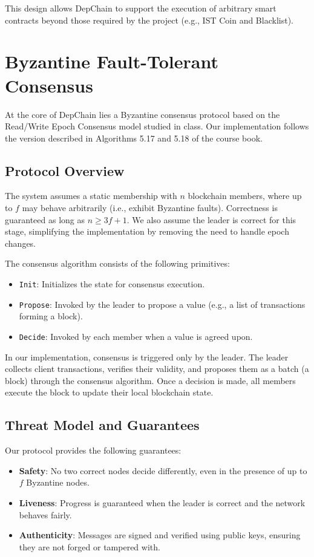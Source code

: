 \documentclass[runningheads]{llncs}
\begin{document}
This design allows DepChain to support the execution of arbitrary smart contracts beyond those required by the project (e.g., IST Coin and Blacklist).

\section{Byzantine Fault-Tolerant Consensus}

At the core of DepChain lies a Byzantine consensus protocol based on the Read/Write Epoch Consensus model studied in class. Our implementation follows the version described in Algorithms 5.17 and 5.18 of the course book.

\subsection{Protocol Overview}

The system assumes a static membership with $n$ blockchain members, where up to $f$ may behave arbitrarily (i.e., exhibit Byzantine faults). Correctness is guaranteed as long as $n \geq 3f + 1$. We also assume the leader is correct for this stage, simplifying the implementation by removing the need to handle epoch changes.

The consensus algorithm consists of the following primitives:
\begin{itemize}
    \item \texttt{Init}: Initializes the state for consensus execution.
    \item \texttt{Propose}: Invoked by the leader to propose a value (e.g., a list of transactions forming a block).
    \item \texttt{Decide}: Invoked by each member when a value is agreed upon.
\end{itemize}

In our implementation, consensus is triggered only by the leader. The leader collects client transactions, verifies their validity, and proposes them as a batch (a block) through the consensus algorithm. Once a decision is made, all members execute the block to update their local blockchain state.

\subsection{Threat Model and Guarantees}

Our protocol provides the following guarantees:
\begin{itemize}
    \item \textbf{Safety}: No two correct nodes decide differently, even in the presence of up to $f$ Byzantine nodes.
    \item \textbf{Liveness}: Progress is guaranteed when the leader is correct and the network behaves fairly.
    \item \textbf{Authenticity}: Messages are signed and verified using public keys, ensuring they are not forged or tampered with.
\end{itemize}
\end{document}
